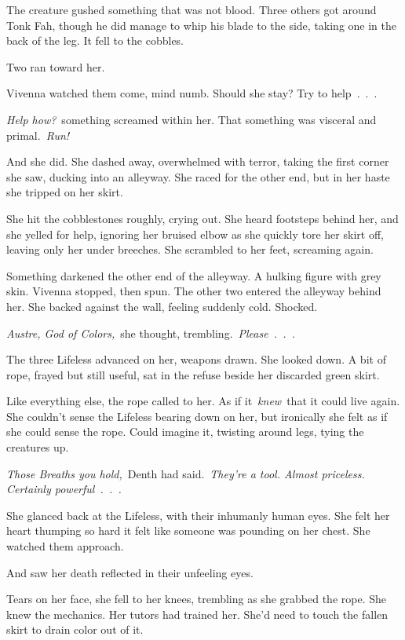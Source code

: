 The creature gushed something that was not blood. Three others got around Tonk Fah, though he did manage to whip his blade to the side, taking one in the back of the leg. It fell to the cobbles.

Two ran toward her.

Vivenna watched them come, mind numb. Should she stay? Try to help~.~.~.

\textit{Help how?}~something screamed within her. That something was visceral and primal.~\textit{Run!}

And she did. She dashed away, overwhelmed with terror, taking the first corner she saw, ducking into an alleyway. She raced for the other end, but in her haste she tripped on her skirt.

She hit the cobblestones roughly, crying out. She heard footsteps behind her, and she yelled for help, ignoring her bruised elbow as she quickly tore her skirt off, leaving only her under breeches. She scrambled to her feet, screaming again.

Something darkened the other end of the alleyway. A hulking figure with grey skin. Vivenna stopped, then spun. The other two entered the alleyway behind her. She backed against the wall, feeling suddenly cold. Shocked.

\textit{Austre, God of Colors,}~she thought, trembling.~\textit{Please~.~.~.}

The three Lifeless advanced on her, weapons drawn. She looked down. A bit of rope, frayed but still useful, sat in the refuse beside her discarded green skirt.

Like everything else, the rope called to her. As if it~\textit{knew}~that it could live again. She couldn’t sense the Lifeless bearing down on her, but ironically she felt as if she could sense the rope. Could imagine it, twisting around legs, tying the creatures up.

\textit{Those Breaths you hold,}~Denth had said.~\textit{They’re a tool. Almost priceless. Certainly powerful~.~.~.}

She glanced back at the Lifeless, with their inhumanly human eyes. She felt her heart thumping so hard it felt like someone was pounding on her chest. She watched them approach.

And saw her death reflected in their unfeeling eyes.

Tears on her face, she fell to her knees, trembling as she grabbed the rope. She knew the mechanics. Her tutors had trained her. She’d need to touch the fallen skirt to drain color out of it.

